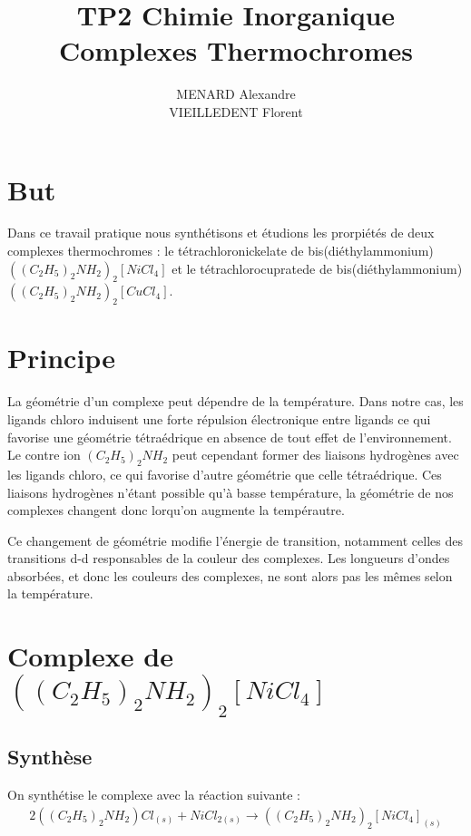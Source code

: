 \documentclass[12pt]{article}
\title{\textbf{TP2 Chimie Inorganique} \\ Complexes Thermochromes}
\author{MENARD Alexandre \\ VIEILLEDENT Florent}
\begin{document}
\maketitle

\section{But}
Dans ce travail pratique nous synthétisons et étudions les prorpiétés de deux complexes thermochromes : le tétrachloronickelate de bis(diéthylammonium) $((C_2H_5)_2NH_2)_2[NiCl_4]$ et le tétrachlorocupratede de bis(diéthylammonium) $((C_2H_5)_2NH_2)_2[CuCl_4]$.

\section{Principe}
La géométrie d'un complexe peut dépendre de la température. 
Dans notre cas, les ligands chloro induisent une forte répulsion électronique entre ligands ce qui favorise une géométrie tétraédrique en absence de tout effet de l'environnement.
Le contre ion $(C_2H_5)_2NH_2$ peut cependant former des liaisons hydrogènes avec les ligands chloro, ce qui favorise d'autre géométrie que celle tétraédrique.
Ces liaisons hydrogènes n'étant possible qu'à basse température, la géométrie de nos complexes changent donc lorqu'on augmente la tempérautre.

Ce changement de géométrie modifie l'énergie de transition, notamment celles des transitions d-d responsables de la couleur des complexes.
Les longueurs d'ondes absorbées, et donc les couleurs des complexes, ne sont alors pas les mêmes selon la température.

\newpage

\section{Complexe  de $((C_2H_5)_2NH_2)_2[NiCl_4]$}
\subsection{Synthèse}
On synthétise le complexe avec la réaction suivante :
\begin{align}
    2((C_2H_5)_2NH_2)Cl_{(s)} + NiCl_{2(s)} \longrightarrow ((C_2H_5)_2NH_2)_2[NiCl_4]_{(s)}
\label{eq1:Premiere synthese}
\end{align}
\end{document}
